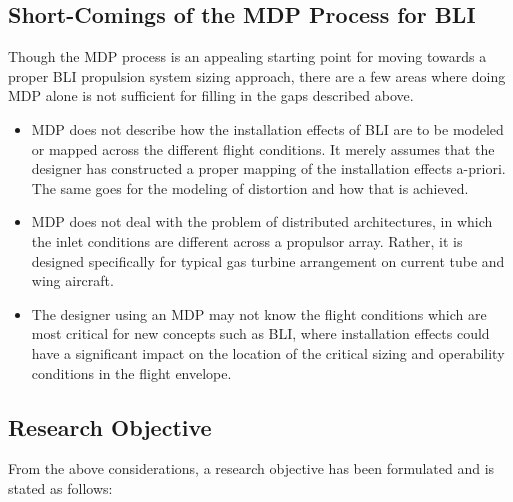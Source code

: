 	\subsection{Short-Comings of the MDP Process for BLI}  
		Though the MDP process is an appealing starting point for moving towards a proper BLI propulsion system sizing approach, there are a few areas where doing MDP alone is not sufficient for filling in the gaps described above.
		
		\begin{itemize}
			\item{MDP does not describe how the installation effects of BLI are to be modeled or mapped across the different flight conditions.  It merely assumes that the designer has constructed a proper mapping of the installation effects a-priori.  The same goes for the modeling of distortion and how that is achieved.}
			\item{MDP does not deal with the problem of distributed architectures, in which the inlet conditions are different across a propulsor array.  Rather, it is designed specifically for typical gas turbine arrangement on current tube and wing aircraft.}
			\item{The designer using an MDP may not know the flight conditions which are most critical for new concepts such as BLI, where installation effects could have a significant impact on the location of the critical sizing and operability conditions in the flight envelope.}
		\end{itemize}
		
	\subsection{Research Objective}
		From the above considerations, a research objective has been formulated and is stated as follows:				
		
		\vspace{1pt}
		\vspace{5mm}

